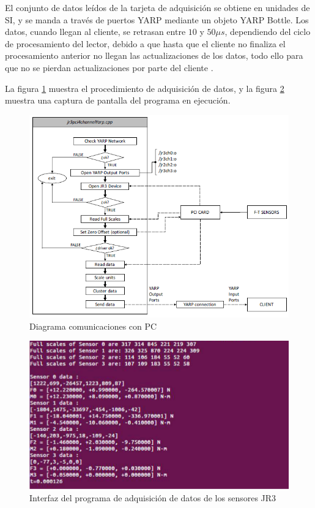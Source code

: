 El conjunto de datos leídos de la tarjeta de adquisición se obtiene en unidades de SI, y se manda a través de puertos YARP mediante un objeto YARP Bottle. Los datos, cuando llegan al cliente, se retrasan entre $10$ y $50\mu s$, dependiendo del ciclo de procesamiento del lector, debido a que hasta que el cliente no finaliza el procesamiento anterior no llegan las actualizaciones de los datos, todo ello para que no se pierdan actualizaciones por parte del cliente \cite{ref14}.

La figura \ref{figura36} muestra el procedimiento de adquisición de datos, y la figura \ref{figura37} muestra una captura de pantalla del programa en ejecución.


\begin{figure}[H]
\centering
\includegraphics[scale=0.8]{imagenes/apartado_3/36_programa_adquisicion_datos}
\caption{Diagrama comunicaciones con PC}
\label{figura36}
\end{figure}

\begin{figure}[H]
\centering
\includegraphics[scale=0.7]{imagenes/apartado_3/37_interfaz_programa_adquisicion_datos}
\caption{Interfaz del programa de adquisición de datos de los sensores JR3}
\label{figura37}
\end{figure}

